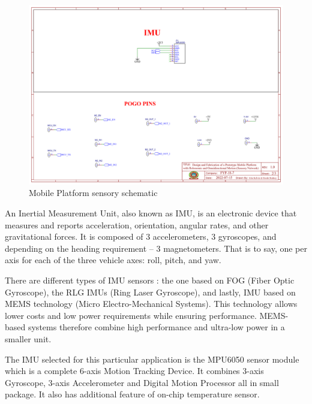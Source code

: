 \begin{figure}[H]
    \centering
    \includegraphics[scale=0.4]{Figures/MPsensory.png}
    \caption{Mobile Platform sensory schematic}
    \label{fig:mobileplatformsensory}
\end{figure}

\par
An Inertial Measurement Unit, also known as \ac{IMU}, is an electronic device that measures and reports acceleration, orientation, angular rates, and other gravitational forces. It is composed of 3 accelerometers, 3 gyroscopes, and depending on the heading requirement – 3 magnetometers. That is to say, one per axis for each of the three vehicle axes: roll, pitch, and yaw.

There are different types of \ac{IMU} sensors \cite{noauthor_imu_nodate}: the one based on FOG (Fiber Optic Gyroscope), the RLG \ac{IMU}s (Ring Laser Gyroscope), and lastly, \ac{IMU} based on MEMS technology (Micro Electro-Mechanical Systems). This technology allows lower costs and low power requirements while ensuring performance. MEMS-based systems therefore combine high performance and ultra-low power in a smaller unit.
\par
The \ac{IMU} selected for this particular application is the MPU6050 sensor module which is a complete 6-axis Motion Tracking Device. It combines 3-axis Gyroscope, 3-axis Accelerometer and Digital Motion Processor all in small package\cite{noauthor_mpu6050_nodate}. It also has additional feature of on-chip temperature sensor. 

